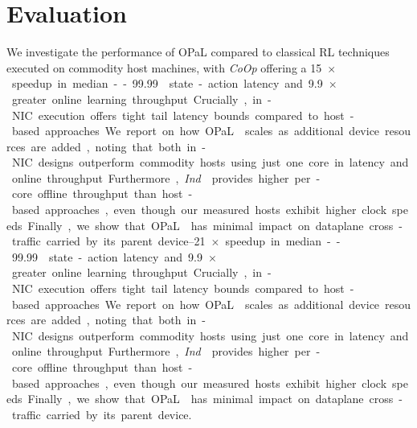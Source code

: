 \documentclass[
sigconf,natbib=false
,anonymous=true
,10pt
]{acmart}
\newcommand{\approachshort}{OPaL}
\newcommand{\Coopfw}{\emph{CoOp}}
\newcommand{\Indfw}{\emph{Ind}}
\begin{document}
%

\section{Evaluation}\label{sec:evaluation}
We investigate the performance of \approachshort{} compared to classical RL techniques executed on commodity host machines, with \Coopfw{} offering a \SIrange{15}{21}{$\times$} speedup in median--\num{99.99} state-action latency and \SI{9.9}{$\times$} greater online learning throughput.
Crucially, in-NIC execution offers tight tail latency bounds compared to host-based approaches.
We report on how \approachshort{} scales as additional device resources are added, noting that both in-NIC designs outperform commodity hosts using just one core in latency and online throughput.
Furthermore, \Indfw{} provides higher per-core offline throughput than host-based approaches, even though our measured hosts exhibit higher clock speeds.
Finally, we show that \approachshort{} has minimal impact on dataplane cross-traffic carried by its parent device.
\end{document}
